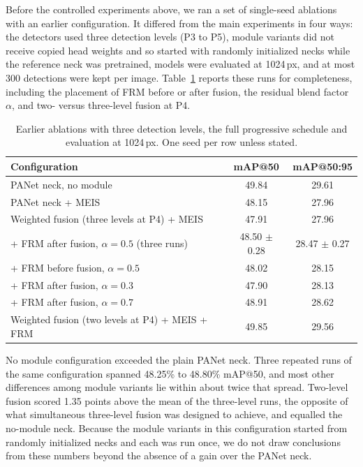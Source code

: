 \documentclass[preprint,12pt]{elsarticle}
\begin{document}
Before the controlled experiments above, we ran a set of single-seed ablations
with an earlier configuration. It differed from the main experiments in four ways:
the detectors used three detection levels (P3 to P5), module variants did not
receive copied head weights and so started with randomly initialized necks while
the reference neck was pretrained, models were evaluated at 1024\,px, and at most
300 detections were kept per image. Table~\ref{tab:early} reports these runs for
completeness, including the placement of FRM before or after fusion, the residual
blend factor $\alpha$, and two- versus three-level fusion at P4.

\begin{table}[t]
\centering
\caption{Earlier ablations with three detection levels, the full progressive
schedule and evaluation at 1024\,px. One seed per row unless stated.}
\label{tab:early}
\small
\begin{tabular}{lcc}
\toprule
Configuration & mAP@50 & mAP@50:95 \\
\midrule
PANet neck, no module                                    & 49.84 & 29.61 \\
PANet neck + MEIS                                        & 48.15 & 27.96 \\
Weighted fusion (three levels at P4) + MEIS              & 47.91 & 27.96 \\
\quad + FRM after fusion, $\alpha=0.5$ (three runs)      & 48.50 $\pm$ 0.28 & 28.47 $\pm$ 0.27 \\
\quad + FRM before fusion, $\alpha=0.5$                  & 48.02 & 28.15 \\
\quad + FRM after fusion, $\alpha=0.3$                   & 47.90 & 28.13 \\
\quad + FRM after fusion, $\alpha=0.7$                   & 48.91 & 28.62 \\
Weighted fusion (two levels at P4) + MEIS + FRM          & 49.85 & 29.56 \\
\bottomrule
\end{tabular}
\end{table}

No module configuration exceeded the plain PANet neck. Three repeated runs of the
same configuration spanned 48.25\% to 48.80\% mAP@50, and most other differences
among module variants lie within about twice that spread. Two-level fusion scored
1.35 points above the mean of the three-level runs, the opposite of what
simultaneous three-level fusion was designed to achieve, and equalled the
no-module neck. Because the module variants in this configuration started from
randomly initialized necks and each was run once, we do not draw conclusions from
these numbers beyond the absence of a gain over the PANet neck.



\end{document}
